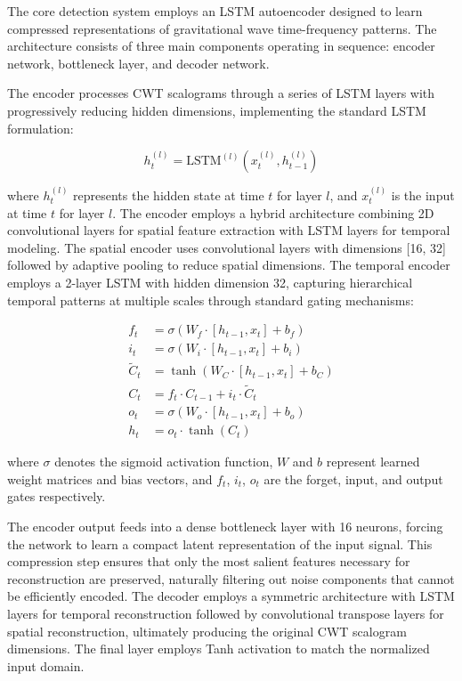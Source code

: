 \documentclass{iopjournal}
\begin{document}
The core detection system employs an LSTM autoencoder designed to learn compressed representations of gravitational wave time-frequency patterns. The architecture consists of three main components operating in sequence: encoder network, bottleneck layer, and decoder network.

The encoder processes CWT scalograms through a series of LSTM layers with progressively reducing hidden dimensions, implementing the standard LSTM formulation:

\begin{equation}
h_t^{(l)} = \text{LSTM}^{(l)}(x_t^{(l)}, h_{t-1}^{(l)})
\end{equation}

where $h_t^{(l)}$ represents the hidden state at time $t$ for layer $l$, and $x_t^{(l)}$ is the input at time $t$ for layer $l$. The encoder employs a hybrid architecture combining 2D convolutional layers for spatial feature extraction with LSTM layers for temporal modeling. The spatial encoder uses convolutional layers with dimensions [16, 32] followed by adaptive pooling to reduce spatial dimensions. The temporal encoder employs a 2-layer LSTM with hidden dimension 32, capturing hierarchical temporal patterns at multiple scales through standard gating mechanisms:

\begin{align}
f_t &= \sigma(W_f \cdot [h_{t-1}, x_t] + b_f) \\
i_t &= \sigma(W_i \cdot [h_{t-1}, x_t] + b_i) \\
\tilde{C}_t &= \tanh(W_C \cdot [h_{t-1}, x_t] + b_C) \\
C_t &= f_t \cdot C_{t-1} + i_t \cdot \tilde{C}_t \\
o_t &= \sigma(W_o \cdot [h_{t-1}, x_t] + b_o) \\
h_t &= o_t \cdot \tanh(C_t)
\end{align}

where $\sigma$ denotes the sigmoid activation function, $W$ and $b$ represent learned weight matrices and bias vectors, and $f_t$, $i_t$, $o_t$ are the forget, input, and output gates respectively.

The encoder output feeds into a dense bottleneck layer with 16 neurons, forcing the network to learn a compact latent representation of the input signal. This compression step ensures that only the most salient features necessary for reconstruction are preserved, naturally filtering out noise components that cannot be efficiently encoded. The decoder employs a symmetric architecture with LSTM layers for temporal reconstruction followed by convolutional transpose layers for spatial reconstruction, ultimately producing the original CWT scalogram dimensions. The final layer employs Tanh activation to match the normalized input domain.
\end{document}
